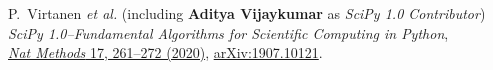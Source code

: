 \begin{etaremune}
	\item 	P.~Virtanen {\it et al.} (including \textbf{Aditya Vijaykumar} as \textit{SciPy 1.0 Contributor})\\
	\textit{SciPy 1.0--Fundamental Algorithms for Scientific Computing in Python},\\
	\href{https://www.nature.com/articles/s41592-019-0686-2}{\textit{Nat Methods} 17, 261–272 (2020)},
	\href{https://arxiv.org/abs/1907.10121}{arXiv:1907.10121}.
	
\end{etaremune}
